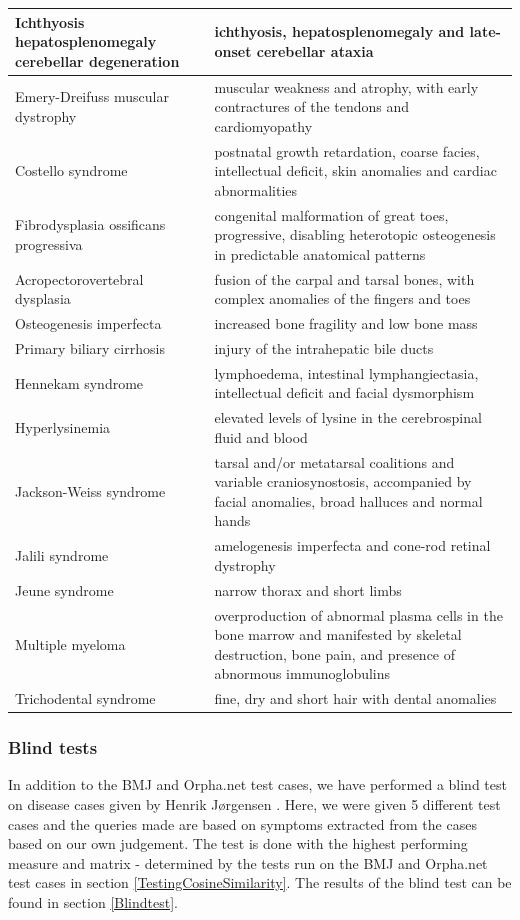 \begin{table}[H]
\begin{scriptsize}
\begin{tabular}{| p{6cm} | p{6.5cm} |}
\hline
Ichthyosis hepatosplenomegaly cerebellar degeneration & ichthyosis, hepatosplenomegaly and late-onset cerebellar ataxia \\
\hline
Emery-Dreifuss muscular dystrophy & muscular weakness and atrophy, with early contractures of the tendons and cardiomyopathy \\
\hline
Costello syndrome & postnatal growth retardation, coarse facies, intellectual deficit, skin anomalies and cardiac abnormalities \\
\hline
Fibrodysplasia ossificans progressiva & congenital malformation of great toes, progressive, disabling heterotopic osteogenesis in predictable anatomical patterns \\
\hline
Acropectorovertebral dysplasia & fusion of the carpal and tarsal bones, with complex anomalies of the fingers and toes \\
\hline
Osteogenesis imperfecta & increased bone fragility and low bone mass \\
\hline
Primary biliary cirrhosis & injury of the intrahepatic bile ducts \\
\hline
Hennekam syndrome & lymphoedema, intestinal lymphangiectasia, intellectual deficit and facial dysmorphism \\
\hline
Hyperlysinemia & elevated levels of lysine in the cerebrospinal fluid and blood \\
\hline
Jackson-Weiss syndrome & tarsal and/or metatarsal coalitions and variable craniosynostosis, accompanied by facial anomalies, broad halluces and normal hands \\
\hline
Jalili syndrome & amelogenesis imperfecta and cone-rod retinal dystrophy \\
\hline
Jeune syndrome & narrow thorax and short limbs \\
\hline
Multiple myeloma & overproduction of abnormal plasma cells in the bone marrow and manifested by skeletal destruction, bone pain, and presence of abnormous immunoglobulins \\
\hline
Trichodental syndrome & fine, dry and short hair with dental anomalies \\
\hline
\end{tabular}
\end{scriptsize}
\end{table}

\subsubsection{Blind tests}
In addition to the BMJ and Orpha.net test cases, we have performed a
blind test on disease cases given by Henrik J\o rgensen \cite{TheDude}. 
Here, we were given 5 different test cases and the queries made are 
based on symptoms extracted from the cases based on our own judgement.
The test is done with the highest performing measure and matrix - determined
by the tests run on the BMJ and Orpha.net test cases in section 
\ref{TestingCosineSimilarity}. The results of the blind test can be found
in section \ref{Blindtest}.

